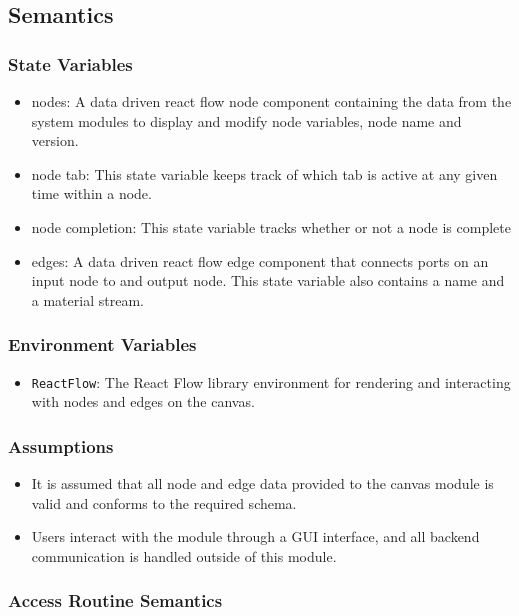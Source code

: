 \documentclass[12pt, titlepage]{article}
\begin{document}
\subsection{Semantics}

\subsubsection{State Variables}

\begin{itemize}
  \item nodes: A data driven react flow node component containing the data from the system modules to display and modify node variables, node name and version.
  \item node tab: This state variable keeps track of which tab is active at any given time within a node.
  \item node completion: This state variable tracks whether or not a node is complete
  \item edges: A data driven react flow edge component that connects ports on an input node to and output node. This state variable also contains a name and a material stream.
\end{itemize}

\subsubsection{Environment Variables}
 \begin{itemize} \item \texttt{ReactFlow}: The React Flow library environment for rendering and interacting with nodes and edges on the canvas. \end{itemize} 

\subsubsection{Assumptions}
\begin{itemize} \item It is assumed that all node and edge data provided to the canvas module is valid and conforms to the required schema. \item Users interact with the module through a GUI interface, and all backend communication is handled outside of this module. \end{itemize} 
\subsubsection{Access Routine Semantics}
\end{document}
